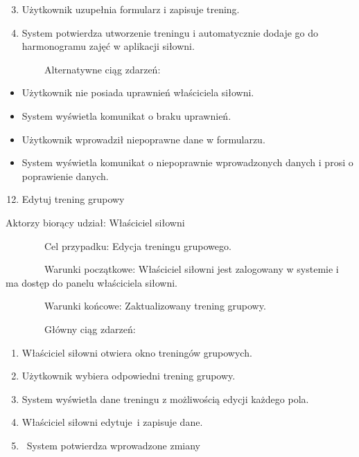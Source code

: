 \documentclass[
]{article}
\providecommand{\tightlist}{%
  \setlength{\itemsep}{0pt}\setlength{\parskip}{0pt}}
\begin{document}
\begin{enumerate}
\setcounter{enumi}{2}
\tightlist
\item
  {Użytkownik uzupełnia formularz i zapisuje trening.}
\item
  {System potwierdza utworzenie treningu i automatycznie dodaje go do
  harmonogramu zajęć w aplikacji siłowni.}
\end{enumerate}

{~~~~~~~~Alternatywne ciąg zdarzeń:}

\begin{itemize}
\tightlist
\item
  {Użytkownik nie posiada uprawnień właściciela siłowni.}
\end{itemize}

\begin{itemize}
\tightlist
\item
  {System wyświetla komunikat o braku uprawnień.}
\end{itemize}

\begin{itemize}
\tightlist
\item
  {Użytkownik wprowadził niepoprawne dane w formularzu.}
\end{itemize}

\begin{itemize}
\tightlist
\item
  {System wyświetla komunikat o niepoprawnie wprowadzonych danych i
  prosi o poprawienie danych.}
\end{itemize}

{}

\begin{enumerate}
\setcounter{enumi}{11}
\tightlist
\item
  {Edytuj trening grupowy}
\end{enumerate}

{Aktorzy biorący udział: Właściciel siłowni}

{~~~~~~~~Cel przypadku: Edycja treningu grupowego.}

{~~~~~~~~Warunki początkowe: Właściciel siłowni jest zalogowany w
systemie i ma dostęp do panelu właściciela siłowni.}

{~~~~~~~~Warunki końcowe: Zaktualizowany trening grupowy.}

{~~~~~~~~Główny ciąg zdarzeń:}

\begin{enumerate}
\tightlist
\item
  {Właściciel siłowni otwiera okno treningów grupowych.}
\item
  {Użytkownik wybiera odpowiedni trening grupowy.}
\item
  {System wyświetla dane treningu z możliwością edycji każdego pola.}
\item
  {Właściciel siłowni }{edytuje}{~i zapisuje dane.}
\item
  {~System potwierdza wprowadzone zmiany}
\end{enumerate}
\end{document}

